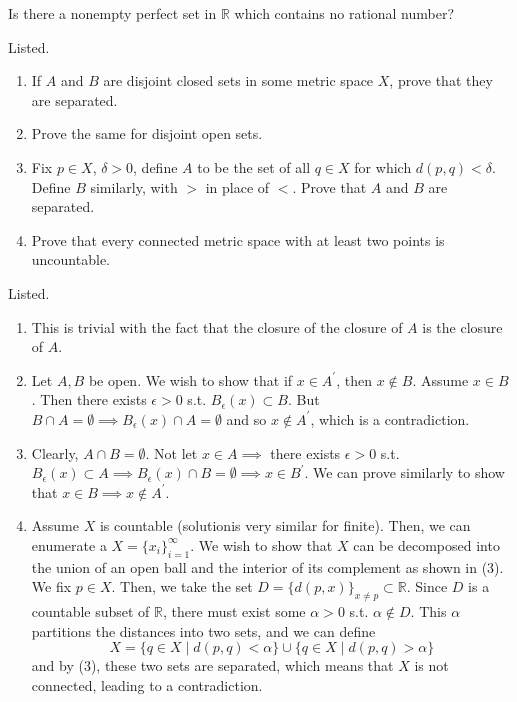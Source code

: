   \begin{exercise}[Rudin 2.18]
    Is there a nonempty perfect set in $\mathbb{R}$ which contains no rational number? 
  \end{exercise}
  \begin{solution}
    
  \end{solution}

  \begin{exercise}[Rudin 2.19]
    Listed. 
    \begin{enumerate}
        \item If $A$ and $B$ are disjoint closed sets in some metric space $X$, prove that they are separated. 
        \item Prove the same for disjoint open sets. 
        \item Fix $p \in X$, $\delta > 0$, define $A$ to be the set of all $q \in X$ for which $d(p, q) < \delta$. Define $B$ similarly, with $>$ in place of $<$. Prove that $A$ and $B$ are separated. 
        \item Prove that every connected metric space with at least two points is uncountable. 
    \end{enumerate}
  \end{exercise}
  \begin{solution}
    Listed. 
    \begin{enumerate}
        \item This is trivial with the fact that the closure of the closure of $A$ is the closure of $A$. 
        \item Let $A, B$ be open. We wish to show that if $x \in A^\prime$, then $x \not\in B$. Assume $x \in B$. Then there exists $\epsilon > 0$ s.t. $B_\epsilon (x) \subset B$. But $B \cap A = \emptyset \implies B_\epsilon (x) \cap A = \emptyset$ and so $x \not\in A^\prime$, which is a contradiction. 

        \item Clearly, $A \cap B = \emptyset$. Not let $x \in A \implies$ there exists $\epsilon > 0$ s.t. $B_\epsilon (x) \subset A \implies B_\epsilon (x) \cap B = \emptyset \implies x \in B^\prime$. We can prove similarly to show that $x \in B \implies x \not\in A^\prime$. 

        \item Assume $X$ is countable (solutionis very similar for finite). Then, we can enumerate a $X = \{x_i\}_{i=1}^\infty$. We wish to show that $X$ can be decomposed into the union of an open ball and the interior of its complement as shown in (3). We fix $p \in X$. Then, we take the set $D = \{d(p, x)\}_{x \neq p} \subset \mathbb{R}$. Since $D$ is a countable subset of $\mathbb{R}$, there must exist some $\alpha > 0$ s.t. $\alpha \not\in D$. This $\alpha$ partitions the distances into two sets, and we can define 
        \[X = \{q \in X \mid d(p, q) < \alpha\} \cup \{q \in X \mid d(p, q) > \alpha\}\]
        and by (3), these two sets are separated, which means that $X$ is not connected, leading to a contradiction. 
    \end{enumerate}
  \end{solution}

